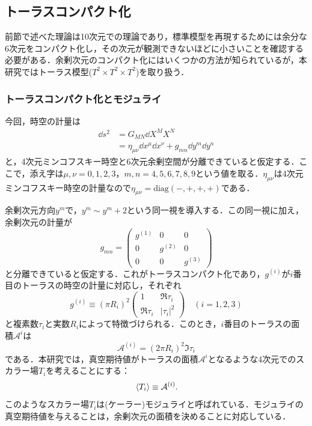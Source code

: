 \documentclass[a4paper,uplatex,dvipdfmx]{jsarticle}
\theoremstyle{definition}
\begin{document}
\subsection{トーラスコンパクト化}

前節で述べた理論は10次元での理論であり，標準模型を再現するためには余分な6次元をコンパクト化し，その次元が観測できないほどに小さいことを確認する必要がある．余剰次元のコンパクト化にはいくつかの方法が知られているが，本研究ではトーラス模型($T^{2}\times T^{2}\times T^{2}$)を取り扱う．

\subsubsection{トーラスコンパクト化とモジュライ}

今回，時空の計量は
\begin{align}
   \dd s^2
   &=
   G_{MN}\dd X^{M}X^{N}
   \nonumber
   \\
   &=
   \eta_{\mu\nu}\dd x^{\mu}\dd x^{\nu}
   +
   g_{mn}\dd y^{m}\dd y^{n}
   \nonumber
\end{align}
と，4次元ミンコフスキー時空と6次元余剰空間が分離できていると仮定する．ここで，添え字は$\mu,\nu=0,1,2,3$，$m,n=4,5,6,7,8,9$という値を取る．$\eta_{\mu\nu}$は4次元ミンコフスキー時空の計量なので$\eta_{\mu\nu}=\text{diag}(-,+,+,+)$である．

余剰次元方向$y^{m}$で，$y^{m}\sim y^{m}+2$という同一視を導入する．この同一視に加え，余剰次元の計量が
\begin{equation}
   g_{mn}
   =
   \begin{pmatrix}
      g^{(1)} & 0 & 0 \\
      0 & g^{(2)} & 0 \\
      0 & 0 & g^{(3)} 
   \end{pmatrix}
   \nonumber
\end{equation}
と分離できていると仮定する．これがトーラスコンパクト化であり，$g^{(i)}$が$i$番目のトーラスの時空の計量に対応し，それぞれ
\begin{equation}
   g^{(i)}
   \equiv
   (\pi R_{i})^2
   \begin{pmatrix}
      1 & \Re\tau_{i} \\
      \Re\tau_{i} & |\tau_{i}|^2
   \end{pmatrix}
   \quad
   (i=1,2,3)
   \nonumber
\end{equation}
と複素数$\tau_{i}$と実数$R_{i}$によって特徴づけられる．このとき，$i$番目のトーラスの面積$\mathcal{A}^{i}$は
\begin{equation}
   \mathcal{A}^{(i)}
   =
   (2\pi R_{i})^2\Im\tau_{i}
   \label{are_torus}
\end{equation}
である．本研究では，真空期待値がトーラスの面積$\mathcal{A}^{i}$となるような4次元でのスカラー場$T_{i}$を考えることにする：
\begin{equation}
   \ev*{T_{i}}
   \equiv
   \mathcal{A}^{(i)}
   .
   \label{def_moduli}
\end{equation}
このようなスカラー場$T_{i}$は(ケーラー)モジュライと呼ばれている．モジュライの真空期待値を与えることは，余剰次元の面積を決めることに対応している．
\end{document}
